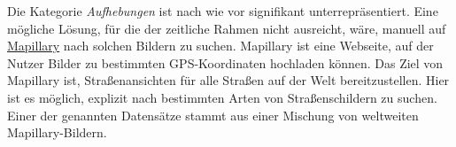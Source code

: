 Die Kategorie \emph{Aufhebungen} ist nach wie vor signifikant unterrepräsentiert. Eine mögliche Lösung, für die der zeitliche Rahmen nicht ausreicht, wäre, manuell auf \href{https://www.mapillary.com/}{Mapillary} nach solchen Bildern zu suchen. Mapillary ist eine Webseite, auf der Nutzer Bilder zu bestimmten GPS-Koordinaten hochladen können. Das Ziel von Mapillary ist, Straßenansichten für alle Straßen auf der Welt bereitzustellen. Hier ist es möglich, explizit nach bestimmten Arten von Straßenschildern zu suchen. Einer der genannten Datensätze stammt aus einer Mischung von weltweiten Mapillary-Bildern. \cite{dataset-mapillary}

